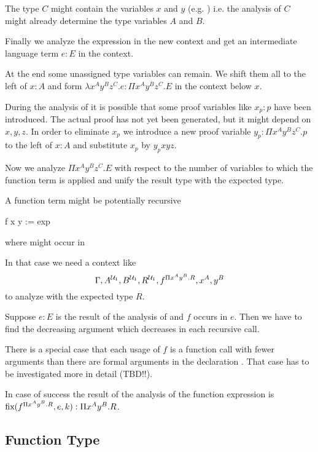 The type $C$ might contain the variables $x$ and $y$ (e.g. )
i.e. the analysis of $C$ might already determine the type variables $A$ and
$B$.

Finally we analyze the expression  in the new context and get an
intermediate language term $e:E$ in the context.

At the end some unassigned type variables can remain. We shift them all to the
left of $x:A$ and form $\lambda x^A y^B z^C . e : \Pi x^A y^B z^C . E$ in the
context below $x$.

During the analysis of  it is possible that some proof variables
like $x_p:p$ have been introduced. The actual proof has not yet been
generated, but it might depend on $x,y,z$. In order to eliminate $x_p$ we
introduce a new proof variable $y_p:\Pi x^A y^B z^C . p$ to the left of $x:A$
and substitute $x_p$ by $y_p x y z$.

Now we analyze $\Pi x^A y^B z^C . E$ with respect to the number of variables
to which the function term is applied and unify the result type with the
expected type.



A function term might be potentially recursive
\begin{alba}
  f x y := exp
\end{alba}
where  might occur in 

In that case we need a context like
$$
  \Gamma, A^{{\cal{U}}_1}, B^{{\cal{U}}_1},  R^{{\cal{U}}_1}, f^{\Pi x^A y^B.R}, x^A, y^B
$$
%
to analyze  with the expected type $R$.

Suppose $e:E$ is the result of the analysis of  and $f$ occurs in
$e$. Then we have to find the decreasing argument which decreases in each
recursive call.

There is a special case that each usage of $f$ is a function call with fewer
arguments than there are formal arguments in the declaration . That case has to be investigated more in detail (TBD!!).

In case of success the result of the analysis of the function expression is
$\text{fix}(f^{\Pi x^A y^B. R}, e, k) : \Pi x^A y^B. R$.





\subsection{Function Type}


